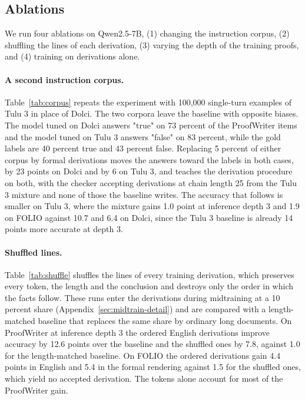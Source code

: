 \documentclass{article}
\begin{document}
\subsection{Ablations}
\label{sec:ablations}

We run four ablations on Qwen2.5-7B, (1) changing the instruction corpus,
(2) shuffling the lines of each derivation, (3) varying the depth of the
training proofs, and (4) training on derivations alone.

\paragraph{A second instruction corpus.}
\label{sec:corpus}
Table~\ref{tab:corpus} repeats the experiment with 100{,}000 single-turn
examples of Tulu 3 \citep{lambert2025tulu} in place of Dolci. The two
corpora leave the baseline with opposite biases. The model tuned on Dolci
answers "true" on 73 percent of the ProofWriter items and the model tuned on
Tulu 3 answers "false" on 83 percent, while the gold labels are 40 percent
true and 43 percent false. Replacing 5 percent of either corpus by formal
derivations moves the answers toward the labels in both cases, by 23 points
on Dolci and by 6 on Tulu 3, and teaches the derivation procedure on both,
with the checker accepting derivations at chain length 25 from the Tulu 3
mixture and none of those the baseline writes. The accuracy that follows is smaller on Tulu 3,
where the mixture gains 1.0 point at inference depth 3 and 1.9 on FOLIO
against 10.7 and 6.4 on Dolci, since the Tulu 3 baseline is already 14 points
more accurate at depth 3.



\paragraph{Shuffled lines.}
Table~\ref{tab:shuffle} shuffles the lines of every training derivation,
which preserves every token, the length and the conclusion and destroys
only the order in which the facts follow. These runs enter the derivations during
midtraining at a 10 percent share (Appendix~\ref{sec:midtrain-detail}) and
are compared with a length-matched baseline that replaces the same share by
ordinary long documents. On ProofWriter at inference depth 3 the ordered
English derivations improve accuracy by 12.6 points over the baseline and
the shuffled ones by 7.8, against 1.0 for the length-matched baseline. On
FOLIO the ordered derivations gain 4.4 points in English and 5.4 in the formal rendering against
1.5 for the shuffled ones, which yield no accepted derivation. The tokens
alone account for most of the ProofWriter gain.
\end{document}

